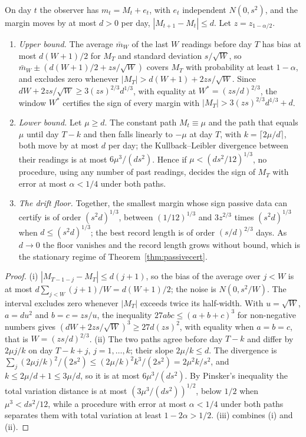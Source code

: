 \begin{proposition}\label{prop:drift}
On day $t$ the observer has $m_t=M_t+e_t$, with $e_t$ independent $N(0,s^2)$, and the margin moves by at most $d>0$ per day, $|M_{t+1}-M_t|\le d$. Let $z=z_{1-\alpha/2}$.
\begin{enumerate}[label=(\roman*)]
\item \emph{Upper bound.} The average $\bar m_W$ of the last $W$ readings before day $T$ has bias at most $d(W+1)/2$ for $M_T$ and standard deviation $s/\sqrt W$, so $\bar m_W\pm(d(W+1)/2+zs/\sqrt W)$ covers $M_T$ with probability at least $1-\alpha$, and excludes zero whenever $|M_T|>d(W+1)+2zs/\sqrt W$. Since $dW+2zs/\sqrt W\ge3(zs)^{2/3}d^{1/3}$, with equality at $W^*=(zs/d)^{2/3}$, the window $W^*$ certifies the sign of every margin with $|M_T|>3(zs)^{2/3}d^{1/3}+d$.
\item \emph{Lower bound.} Let $\mu\ge d$. The constant path $M_t\equiv\mu$ and the path that equals $\mu$ until day $T-k$ and then falls linearly to $-\mu$ at day $T$, with $k=\lceil2\mu/d\rceil$, both move by at most $d$ per day; the Kullback--Leibler divergence between their readings is at most $6\mu^3/(ds^2)$. Hence if $\mu<(ds^2/12)^{1/3}$, no procedure, using any number of past readings, decides the sign of $M_T$ with error at most $\alpha<1/4$ under both paths.
\item \emph{The drift floor.} Together, the smallest margin whose sign passive data can certify is of order $(s^2d)^{1/3}$, between $(1/12)^{1/3}$ and $3z^{2/3}$ times $(s^2d)^{1/3}$ when $d\le(s^2d)^{1/3}$; the best record length is of order $(s/d)^{2/3}$ days. As $d\to0$ the floor vanishes and the record length grows without bound, which is the stationary regime of Theorem~\ref{thm:passivecert}.
\end{enumerate}
\hfill\Proved
\end{proposition}

\begin{proof}
(i) $|M_{T-1-j}-M_T|\le d(j+1)$, so the bias of the average over $j<W$ is at most $d\sum_{j<W}(j+1)/W=d(W+1)/2$; the noise is $N(0,s^2/W)$. The interval excludes zero whenever $|M_T|$ exceeds twice its half-width. With $u=\sqrt W$, $a=du^2$ and $b=c=zs/u$, the inequality $27abc\le(a+b+c)^3$ for non-negative numbers gives $(dW+2zs/\sqrt W)^3\ge27d(zs)^2$, with equality when $a=b=c$, that is $W=(zs/d)^{2/3}$. (ii) The two paths agree before day $T-k$ and differ by $2\mu j/k$ on day $T-k+j$, $j=1,\dots,k$; their slope $2\mu/k\le d$. The divergence is $\sum_j(2\mu j/k)^2/(2s^2)\le(2\mu/k)^2k^3/(2s^2)=2\mu^2k/s^2$, and $k\le2\mu/d+1\le3\mu/d$, so it is at most $6\mu^3/(ds^2)$. By Pinsker's inequality the total variation distance is at most $(3\mu^3/(ds^2))^{1/2}$, below $1/2$ when $\mu^3<ds^2/12$, while a procedure with error at most $\alpha<1/4$ under both paths separates them with total variation at least $1-2\alpha>1/2$. (iii) combines (i) and (ii).
\end{proof}

